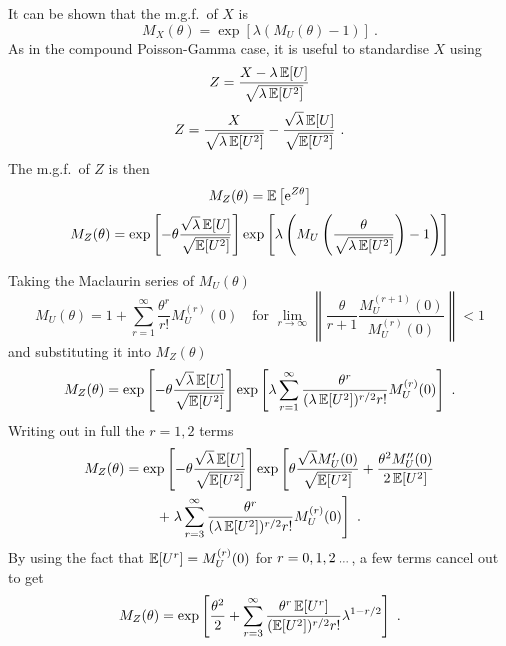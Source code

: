 It can be shown that the m.g.f.~of $X$ is
\begin{equation}
	M_X(\theta)=
	\exp\left[
		\lambda(M_U(\theta)-1)
	\right]
	\ .
\end{equation}
As in the compound Poisson-Gamma case, it is useful to standardise $X$ using
\begin{equation*}
	Z = \frac{X-\lambda\operatorname{\mathbb{E}}[U]}{\sqrt{\lambda\operatorname{\mathbb{E}}[U^2]}}
\end{equation*}
\begin{equation}
	Z = \frac{X}{\sqrt{\lambda\operatorname{\mathbb{E}}[U^2]}}
	-\frac{\sqrt{\lambda}\operatorname{\mathbb{E}}[U]}{\sqrt{\operatorname{\mathbb{E}}[U^2]}}
	\ .
\end{equation}
The m.g.f.~of $Z$ is then
\begin{equation*}
	M_Z(\theta)=\operatorname{\mathbb{E}}\left[\mathrm{e}^{Z\theta}\right]
\end{equation*}
\begin{equation*}
	M_Z(\theta)=
	\exp\left[
	    -\theta\frac{\sqrt{\lambda}\operatorname{\mathbb{E}}[U]}{\sqrt{\operatorname{\mathbb{E}}[U^2]}}
	\right]
	\exp\left[
	\lambda
	\left(
		M_U
		\left(
			\frac{\theta}{\sqrt{\lambda\operatorname{\mathbb{E}}[U^2]}}\right)-1
		\right)
	\right]
\end{equation*}

Taking the Maclaurin series of $M_U(\theta)$
\begin{equation}
	M_U(\theta) = 1 + \sum_{r=1}^\infty\frac{\theta^r}{r!}M_U^{(r)}(0)
	\quad\text{for }\lim_{r\rightarrow\infty}
	\left\|
		\frac{\theta}{r+1}\frac{M_U^{(r+1)}(0)}{M_U^{(r)}(0)}
	\right\|<1
\end{equation}
and substituting it into $M_Z(\theta)$
\begin{equation*}
	M_Z(\theta)=
	\exp\left[
	    -\theta\frac{\sqrt{\lambda}\operatorname{\mathbb{E}}[U]}{\sqrt{\operatorname{\mathbb{E}}[U^2]}}
    \right]
	\exp\left[
		\lambda\sum_{r=1}^\infty\frac{\theta^r}{(\lambda\operatorname{\mathbb{E}}[U^2])^{r/2}r!}M_U^{(r)}(0)
	\right]
	\ .
\end{equation*}
Writing out in full the $r=1,2$ terms
\begin{multline*}
	M_Z(\theta)=\exp\left[
	    -\theta\frac{\sqrt{\lambda}\operatorname{\mathbb{E}}[U]}{\sqrt{\operatorname{\mathbb{E}}[U^2]}}
	\right]
	\exp\left[
		\theta\frac{\sqrt{\lambda}M_U'(0)}{\sqrt{\operatorname{\mathbb{E}}[U^2]}}
		+
		\frac{\theta^2M_U''(0)}{2\operatorname{\mathbb{E}}[U^2]}
	\right.
	\\+
	\left.
		\lambda\sum_{r=3}^\infty\frac{\theta^r}{(\lambda\operatorname{\mathbb{E}}[U^2])^{r/2}r!}M_U^{(r)}(0)
	\right]
	\ .
\end{multline*}
By using the fact that $\operatorname{\mathbb{E}}[U^r]=M_U^{(r)}(0)$ for $r=0,1,2\dotdotdot$, a few terms cancel out to get
\begin{equation}
	M_Z(\theta)=
	\exp\left[
		\frac{\theta^2}{2}
		+
		\sum_{r=3}^\infty\frac{\theta^r \operatorname{\mathbb{E}}[U^r]}{(\operatorname{\mathbb{E}}[U^2])^{r/2}r!}\lambda^{1-r/2}
	\right]
	\ .
\end{equation}

